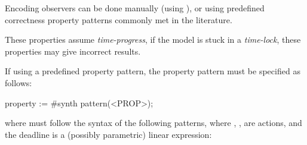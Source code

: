 Encoding observers can be done manually (using \adhoc{} \IPTA{}), or using predefined correctness property patterns commonly met in the literature.

\begin{becareful}
	These properties assume \emph{time-progress}, \ie{} if the model is stuck in a \emph{time-lock}, these properties may give incorrect results.
\end{becareful}

%
%
%
%
%



If using a predefined property pattern, the property pattern must be specified as follows:

\begin{IMITATORproperty}
property := #synth pattern(<PROP>);
\end{IMITATORproperty}

\noindent{}where  must follow the syntax of the following patterns, where , ,  are actions, and the deadline  is a (possibly parametric) linear expression:

